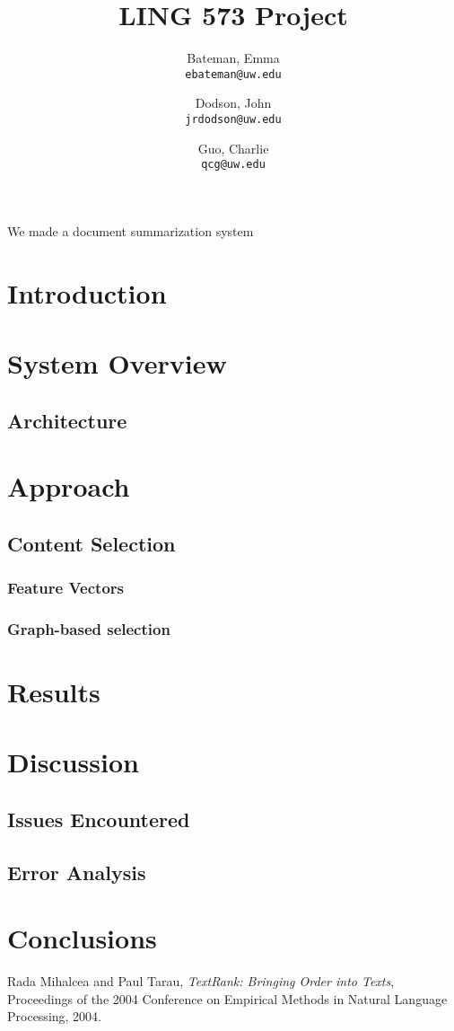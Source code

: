 \documentclass[11pt]{article}
\author{Bateman, Emma \\
  \texttt{ebateman@uw.edu}
  \and
  Dodson, John \\
  \texttt{jrdodson@uw.edu}
  \and
  Guo, Charlie \\
  \texttt{qcg@uw.edu}}
\title{LING 573 Project}
\begin{document}
\maketitle

\abstract
We made a document summarization system

\section{Introduction}

\section{System Overview}

\subsection{Architecture}

\section{Approach}

\subsection{Content Selection}
\subsubsection{Feature Vectors}
\subsubsection{Graph-based selection}

\section{Results}

\section{Discussion}

\subsection{Issues Encountered}

\subsection{Error Analysis}

\section{Conclusions}

\begin{thebibliography}{11}
	Rada Mihalcea and Paul Tarau,
	\textit{TextRank: Bringing Order into Texts},
	Proceedings of the 2004 Conference on Empirical Methods in Natural Language Processing,
	2004.
	
\end{thebibliography}
\end{document}
